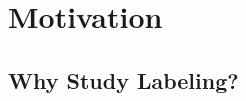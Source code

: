 \documentclass[10pt,journal,compsoc]{IEEEtran}
\newcommand{\bi}{\begin{itemize}[leftmargin=0.4cm]}
\newcommand{\ei}{\end{itemize}}
\begin{document}








 

\section{Motivation}

\subsection{Why Study Labeling?}\label{tion:iia}
\end{document}
